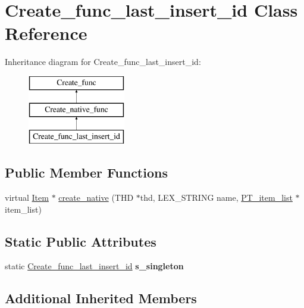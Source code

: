 \hypertarget{classCreate__func__last__insert__id}{}\section{Create\+\_\+func\+\_\+last\+\_\+insert\+\_\+id Class Reference}
\label{classCreate__func__last__insert__id}
Inheritance diagram for Create\+\_\+func\+\_\+last\+\_\+insert\+\_\+id\+:\begin{figure}[H]
\begin{center}
\leavevmode
\includegraphics[height=3.000000cm]{classCreate__func__last__insert__id}
\end{center}
\end{figure}
\subsection*{Public Member Functions}
\begin{DoxyCompactItemize}
\item 
virtual \mbox{\hyperlink{classItem}{Item}} $\ast$ \mbox{\hyperlink{classCreate__func__last__insert__id_a9c0bbed64602ba5cf43063888aadd260}{create\+\_\+native}} (T\+HD $\ast$thd, L\+E\+X\+\_\+\+S\+T\+R\+I\+NG name, \mbox{\hyperlink{classPT__item__list}{P\+T\+\_\+item\+\_\+list}} $\ast$item\+\_\+list)
\end{DoxyCompactItemize}
\subsection*{Static Public Attributes}
\begin{DoxyCompactItemize}
\item 
\mbox{\label{classCreate__func__last__insert__id_a72439d1e3d7977b65afbd5de31aab7ad}} 
static \mbox{\hyperlink{classCreate__func__last__insert__id}{Create\+\_\+func\+\_\+last\+\_\+insert\+\_\+id}} {\bfseries s\+\_\+singleton}
\end{DoxyCompactItemize}
\subsection*{Additional Inherited Members}


